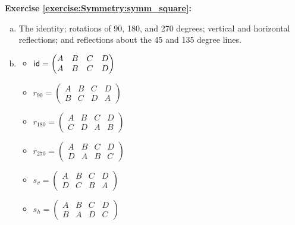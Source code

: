 \noindent\textbf{Exercise \ref{exercise:Symmetry:symm_square}:}
\begin{enumerate}[(a)]
\item
The identity; rotations of 90, 180, and 270 degrees; vertical and horizontal reflections; and reflections about the 45 and 135 degree lines.

\item
	\begin{multicols}{2}
	\begin{itemize}
	\item
	$\sf{id}=\begin{pmatrix}
	A & B & C & D\\
	A & B & C & D
	\end{pmatrix}$
	
	\item
	$r_{90}=\begin{pmatrix}
	A & B & C & D\\
	B & C & D & A
	\end{pmatrix}$
	
	\item
	$r_{180}=\begin{pmatrix}
	A & B & C & D\\
	C & D & A & B
	\end{pmatrix}$
	
	\item
	$r_{270}=\begin{pmatrix}
	A & B & C & D\\
	D & A & B & C
	\end{pmatrix}$
	
	\item
	$s_{v}=\begin{pmatrix}
	A & B & C & D\\
	D & C & B & A
	\end{pmatrix}$
	
	\item
	$s_{h}=\begin{pmatrix}
	A & B & C & D\\
	B & A & D & C
	\end{pmatrix}$
	

\end{itemize}
\end{multicols}
\end{enumerate}
